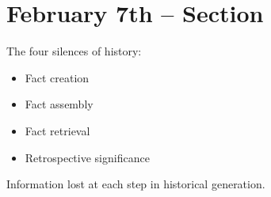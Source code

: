 \section{February 7th -- Section}

The four silences of history:

\begin{itemize}
  \item Fact creation
  \item Fact assembly
  \item Fact retrieval
  \item Retrospective significance
\end{itemize}

Information lost at each step in historical generation.
